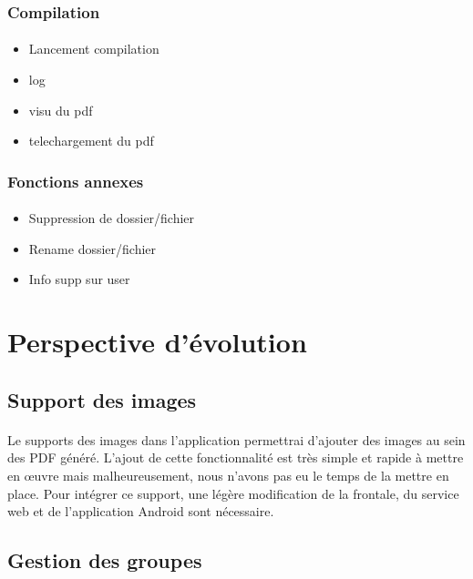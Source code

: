 \documentclass[a4paper,12pt]{article}
\begin{document}
\subsubsection{Compilation}
\paragraph*{}
\begin{itemize}
 \item Lancement compilation
 \item log
 \item visu du pdf
 \item telechargement du pdf
\end{itemize}


\subsubsection{Fonctions annexes}
\paragraph*{}
\begin{itemize}
 \item Suppression de dossier/fichier
 \item Rename dossier/fichier
 \item Info supp sur user
\end{itemize}

\newpage
\section{Perspective d'évolution}
\subsection{Support des images}
\paragraph*{}
Le supports des images dans l'application permettrai d'ajouter des images au sein des PDF généré. L'ajout de cette fonctionnalité est très simple et rapide à mettre en \oe uvre mais malheureusement, nous n'avons pas eu le temps de la mettre en place. Pour intégrer ce support, une légère modification de la frontale, du service web et de l'application Android sont nécessaire.

\subsection{Gestion des groupes}
\end{document}
